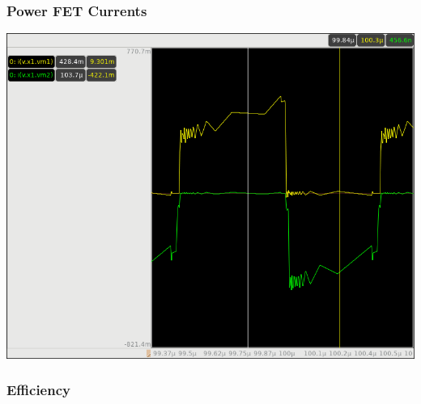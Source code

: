 \documentclass{beamer}
\begin{document}
\begin{frame}
  \frametitle{Power FET Currents}
  \includegraphics[scale=0.25]{hiside-lowside-current.png}
\end{frame}


\begin{frame}
  \frametitle{Efficiency}
\end{frame}
\end{document}
